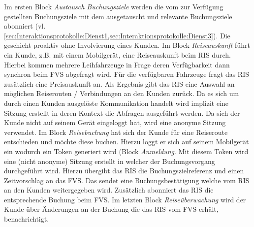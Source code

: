 Im ersten Block \textit{Austausch Buchungsziele} werden die vom  zur Verfügung gestellten Buchungsziele mit dem  ausgetauscht und relevante Buchungsziele abonniert (vl. \cref{sec:Interaktionsprotokolle:Dienst1,sec:Interaktionsprotokolle:Dienst3}). Die geschieht proaktiv ohne Involvierung eines Kunden. 
Im Block \textit{Reiseauskunft} führt ein Kunde, z.B. mit einem Mobilgerät, eine Reiseauskunft beim RIS durch. Hierbei kommen mehrere Leihfahrzeuge in Frage deren Verfügbarkeit dann synchron beim FVS abgefragt wird. Für die verfügbaren Fahrzeuge fragt das RIS zusätzlich eine Preisauskunft an. Als Ergebnis gibt das RIS eine Auswahl an möglichen Reiserouten / Verbindungen an den Kunden zurück. Da es sich um durch einen Kunden ausgelöste Kommunikation handelt wird implizit eine Sitzung erstellt in deren Kontext die Abfragen ausgeführt werden. Da sich der Kunde nicht auf seinem Gerät eingeloggt hat, wird eine anonyme Sitzung verwendet.
Im Block \textit{Reisebuchung} hat sich der Kunde für eine Reiseroute entschieden und möchte diese buchen. Hierzu loggt er sich auf seinem Mobilgerät ein wodurch ein Token generiert wird (Block \emph{Anmeldung}. Mit diesem Token wird eine (nicht anonyme) Sitzung erstellt in welcher der Buchungsvorgang durchgeführt wird. Hierzu übergibt das RIS die Buchungszielreferenz und einen Zeitvorschlag an das FVS. Das sendet eine Buchungsbestätigung welche vom RIS an den Kunden weitergegeben wird. Zusätzlich abonniert das RIS die entsprechende Buchung beim FVS.
Im letzten Block \textit{Reiseüberwachung} wird der Kunde über Änderungen an der Buchung die das RIS vom FVS erhält, benachrichtigt.
